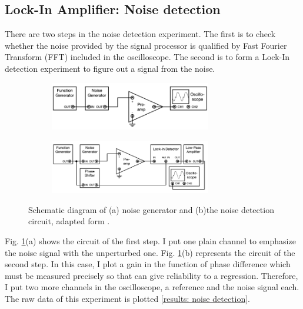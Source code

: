\documentclass{article}
\begin{document}
 \subsection{Lock-In Amplifier: Noise detection}
 There are two steps in the noise detection experiment.
 The first is to check whether the noise provided by the signal processor is qualified by Fast Fourier Transform (FFT) included in the oscilloscope.
 The second is to form a Lock-In detection experiment to figure out a signal from the noise.
 \begin{figure}[ht]
    \centering
    \begin{subfigure}[b]{7cm}
        \centering
        \includegraphics[width=7cm]{../results/noise_circuit.png}
        \caption{}
    \end{subfigure}
    \hfill
    \begin{subfigure}[b]{7cm}
        \centering
        \includegraphics[width=7cm]{../results/noise_detection_circuit.png}
        \caption{}
    \end{subfigure}
    \hfill
    \caption{Schematic diagram of (a) noise generator and (b)the noise detection circuit, adapted form  \cite{signal_processor}.}
    \label{fig: noise detection}
  \end{figure}
 Fig. \ref{fig: noise detection}(a) shows the circuit of the first step.
 I put one plain channel to emphasize the noise signal with the unperturbed one.
 Fig. \ref{fig: noise detection}(b) represents the circuit of the second step.
 In this case, I plot a gain in the function of phase difference which must be measured precisely so that can give reliability to a regression.
 Therefore, I put two more channels in the oscilloscope, a reference and the noise signal each.
 The raw data of this experiment is plotted \ref{results: noise detection}.
\end{document}
